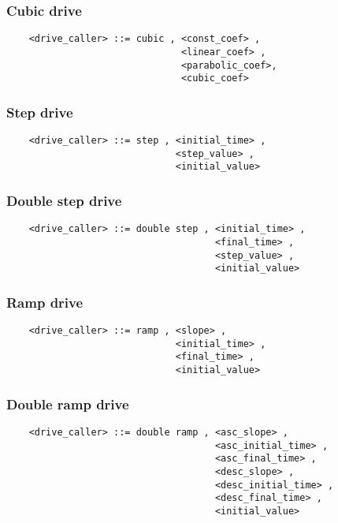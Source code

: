 \subsubsection{Cubic drive}
\begin{verbatim}
    <drive_caller> ::= cubic , <const_coef> , 
                               <linear_coef> ,
                               <parabolic_coef>, 
                               <cubic_coef>
\end{verbatim}

\subsubsection{Step drive}
\begin{verbatim}
    <drive_caller> ::= step , <initial_time> , 
                              <step_value> ,
                              <initial_value>
\end{verbatim}    

\subsubsection{Double step drive}
\begin{verbatim}
    <drive_caller> ::= double step , <initial_time> , 
                                     <final_time> ,
                                     <step_value> , 
                                     <initial_value>
\end{verbatim}

\subsubsection{Ramp drive}
\begin{verbatim}
    <drive_caller> ::= ramp , <slope> , 
                              <initial_time> ,
                              <final_time> , 
                              <initial_value>
\end{verbatim}
  
\subsubsection{Double ramp drive}
\begin{verbatim}
    <drive_caller> ::= double ramp , <asc_slope> , 
                                     <asc_initial_time> , 
                                     <asc_final_time> , 
                                     <desc_slope> , 
                                     <desc_initial_time> , 
                                     <desc_final_time> , 
                                     <initial_value>
\end{verbatim}

